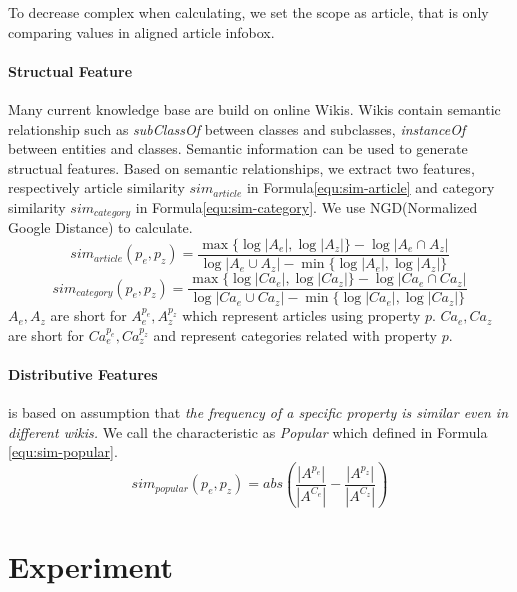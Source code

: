 \documentclass[runningheads,a4paper]{llncs}
\begin{document}
To decrease complex when calculating, we set the scope as article, that is only comparing values in aligned article infobox.

\paragraph{Structual Feature}
Many current knowledge base are build on online Wikis. Wikis contain semantic relationship such as \textit{subClassOf} between classes and subclasses, \textit{instanceOf} between entities and classes. Semantic information can be used to generate structual features\cite{wang2014cross}. Based on semantic relationships, we extract two features, respectively article similarity $sim_{article}$ in Formula\ref{equ:sim-article} and category similarity $sim_{category}$ in Formula\ref{equ:sim-category}. We use NGD(Normalized Google Distance) to calculate.
\begin{equation}
\label{equ:sim-article}
sim_{article}(p_e, p_z) = \frac{\max\{\log |A_e|, \log |A_z|\} - \log|A_e \cap A_z|}
{\log |A_e \cup A_z| - \min\{\log |A_e|, \log |A_z|\}}
\end{equation}
\begin{equation}
\label{equ:sim-category}
sim_{category}(p_e, p_z) = \frac{\max\{\log |Ca_e|, \log |Ca_z|\} - \log|Ca_e \cap Ca_z|}
{\log |Ca_e \cup Ca_z| - \min\{\log |Ca_e|, \log |Ca_z|\}}
\end{equation}
$A_e, A_z$ are short for $A_e^{p_e},A_z^{p_z}$ which represent articles using property $p$. $Ca_e, Ca_z$ are short for $Ca_e^{p_e}, Ca_z^{p_z}$ and represent categories related with property $p$.

\paragraph{Distributive Features}
is based on assumption that \textit{the frequency of a specific property is similar even in different wikis.} We call the characteristic as \textit{Popular} which defined in Formula \ref{equ:sim-popular}.
\begin{equation}
\label{equ:sim-popular}
sim_{popular}(p_e, p_z) = abs(\frac{|A^{p_e}|}{|A^{C_e}|} - \frac{|A^{p_z}|}{|A^{C_z}|})
\end{equation}

\section{Experiment}
\end{document}
